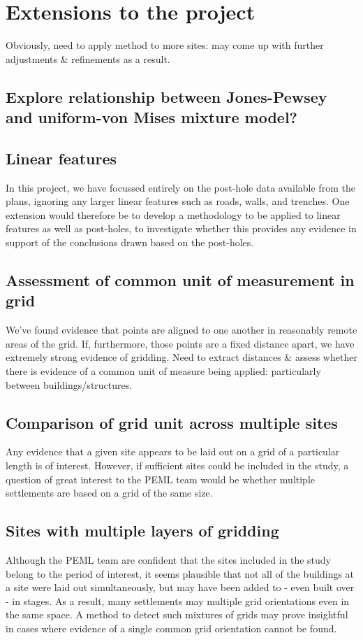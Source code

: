 \documentclass[../../ArchStats.tex]{subfiles}
\begin{document}
\section{Extensions to the project}

Obviously, need to apply method to more sites: may come up with further adjustments \& refinements as a result.

\subsection{Explore relationship between Jones-Pewsey and uniform-von Mises mixture model?}


\subsection{Linear features}
In this project, we have focussed entirely on the post-hole data available from the plans, ignoring any larger linear features such as roads, walls, and trenches. One extension would therefore be to develop a methodology to be applied to linear features as well as post-holes, to investigate whether this provides any evidence in support of the conclusions drawn based on the post-holes.

\subsection{Assessment of common unit of measurement in grid}
We've found evidence that points are aligned to one another in reasonably remote areas of the grid. If, furthermore, those points are a fixed distance apart, we have extremely strong evidence of gridding. Need to extract distances \& assess whether there is evidence of a common unit of measure being applied: particularly between buildings/structures.


\subsection{Comparison of grid unit across multiple sites}
Any evidence that a given site appears to be laid out on a grid of a particular length is of interest. However, if sufficient sites could be included in the study, a question of great interest to the PEML team would be whether multiple settlements are based on a grid of the same size.

\subsection{Sites with multiple layers of gridding}
Although the PEML team are confident that the sites included in the study belong to the period of interest, it seems plausible that not all of the buildings at a site were laid out simultaneously, but may have been added to - even built over - in stages. As a result, many settlements may multiple grid orientations even in the same space. A method to detect such mixtures of grids may prove insightful in cases where evidence of a single common grid orientation cannot be found.
\end{document}
